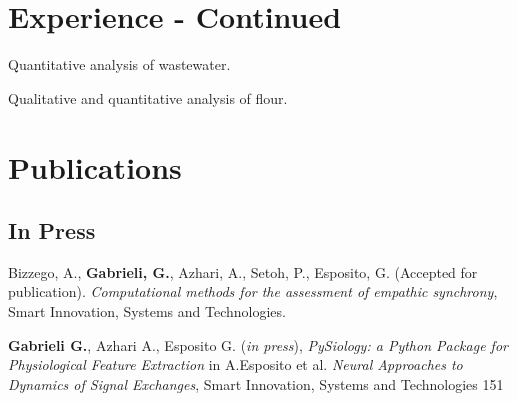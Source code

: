 \documentclass[a4paper]{deedy-resume} %
\begin{document}
\begin{minipage}[t]{0.03\textwidth} %
\end{minipage} %
\hfill
\begin{minipage}[t]{0.63\textwidth} %

\section{Experience - Continued}

\sectionspace


\sectionspace %



Quantitative analysis of wastewater.

\sectionspace %
 
Qualitative and quantitative analysis of flour.  

\sectionspace

\section{Publications}
	\sectionspace
	\begin{tightitemize}
		\subsection{In Press}
		
		    \item Bizzego, A., \textbf{Gabrieli, G.}, Azhari, A., Setoh, P., Esposito, G. (Accepted for publication). \textit{Computational methods for the assessment of empathic synchrony}, Smart Innovation, Systems and Technologies.
		    
			\item \textbf{Gabrieli G.}, Azhari A., Esposito G. (\textit{in press}), \textit{PySiology: a Python Package for Physiological Feature Extraction} in A.Esposito et al. \textit{Neural Approaches to Dynamics of Signal Exchanges}, Smart Innovation, Systems and Technologies 151
			

\end{tightitemize}
\end{minipage}
\end{document}
